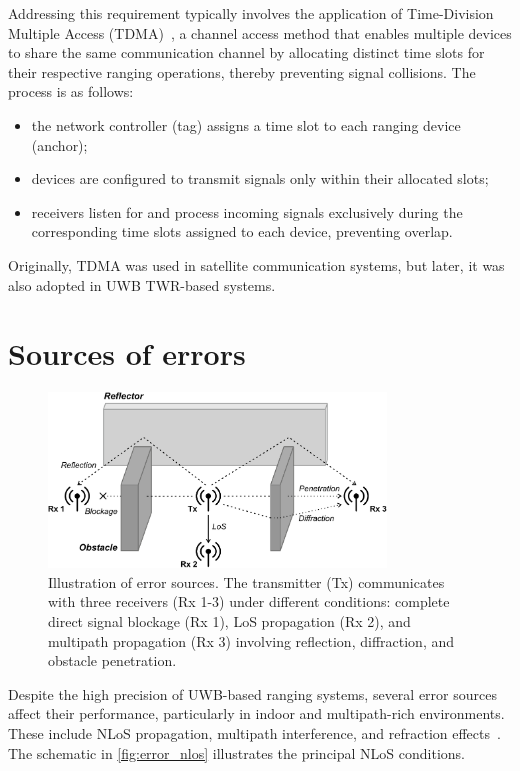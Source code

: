 Addressing this requirement typically involves the application of Time-Division Multiple Access (TDMA)~\cite{falconer1995time, Yanjun2021TDMA}, a channel access method that enables multiple devices to share the same communication channel by allocating distinct time slots for their respective ranging operations, thereby preventing signal collisions. The process is as follows:


\begin{itemize}
    \item the network controller (tag) assigns a time slot to each ranging device (anchor);
    \item devices are configured to transmit signals only within their allocated slots;
    \item receivers listen for and process incoming signals exclusively during the corresponding time slots assigned to each device, preventing overlap.
\end{itemize}

Originally, TDMA was used in satellite communication systems, but later, it was also adopted in UWB TWR-based systems.

\section{Sources of errors}\label{error_sources}

\begin{figure}[tbh]
\includegraphics[width=0.8\textwidth]{Figures/theoretical_background/obstacles.pdf}
\centering
\caption[Illustration of error sources.]{Illustration of error sources. The transmitter (Tx) communicates with three receivers (Rx 1-3) under different conditions: complete direct signal blockage (Rx 1), LoS propagation (Rx 2), and multipath propagation (Rx 3) involving reflection, diffraction, and obstacle penetration.}
\label{fig:error_nlos}
\end{figure}

Despite the high precision of UWB-based ranging systems, several error sources affect their performance, particularly in indoor and multipath-rich environments. These include NLoS propagation, multipath interference, and refraction effects~\cite{dardari2009ranging}. The schematic in \autoref{fig:error_nlos} illustrates the principal NLoS conditions.

